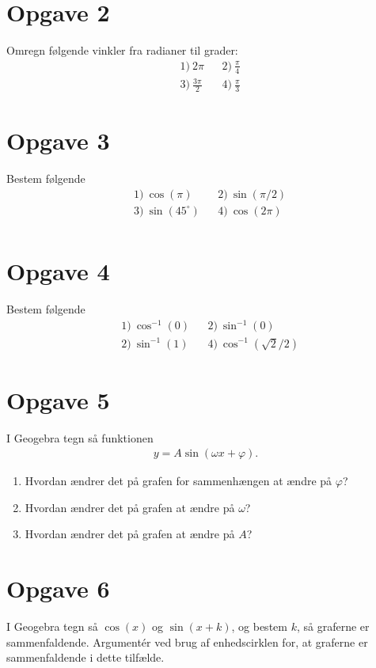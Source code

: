\section*{Opgave 2}
Omregn følgende vinkler fra radianer til grader:
\begin{align*}
&1) \  2\pi  &&2) \  \frac{\pi}{4}    \\
&3) \  \frac{3\pi}{2}  &&4) \  \frac{\pi}{3}    
\end{align*}

\section*{Opgave 3}
Bestem følgende 
\begin{align*}
&1) \ \cos(\pi)    &&2) \ \sin(\pi/2)    \\
&3) \ \sin(45^\circ)    &&4) \ \cos(2\pi)    \\
\end{align*}

\section*{Opgave 4}
Bestem følgende
\begin{align*}
	&1) \ \cos^{-1}(0) &&2) \ \sin^{-1}(0) \\
	&2) \ \sin^{-1}(1) &&4) \ \cos^{-1}(\sqrt{2}/2)
\end{align*}
\section*{Opgave 5}
I Geogebra tegn så funktionen 
\begin{align*}
y = A\sin(\omega x + \varphi).
\end{align*}
\begin{enumerate}[label=\roman*)]
\item Hvordan ændrer det på grafen for sammenhængen at ændre på $\varphi$?
\item Hvordan ændrer det på grafen at ændre på $\omega$?
\item Hvordan ændrer det på grafen at ændre på $A$?
\end{enumerate}

\section*{Opgave 6}
I Geogebra tegn så $\cos(x)$ og $\sin(x+k)$, og bestem $k$, så graferne er sammenfaldende. Argumentér ved brug af enhedscirklen for, at graferne er sammenfaldende i dette tilfælde. 

